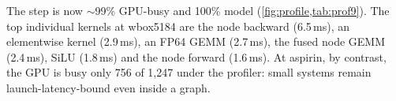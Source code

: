 The step is now $\sim$99\% GPU-busy and 100\% model (\cref{fig:profile,tab:prof9}). The top individual kernels at wbox5184 are the node backward (6.5\,ms), an  elementwise kernel (2.9\,ms), an  FP64 GEMM (2.7\,ms), the fused node GEMM (2.4\,ms), SiLU (1.8\,ms) and the node forward (1.6\,ms). At aspirin, by contrast, the GPU is busy only 756 of 1{,}247\us{} under the profiler: small systems remain launch-latency-bound even inside a graph.
